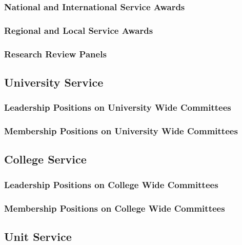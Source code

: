 \subsubsection{National and International Service Awards}

\subsubsection{Regional and Local Service Awards}

\subsubsection{Research Review Panels}

\subsection{University Service}
\subsubsection{Leadership Positions on University Wide Committees}

\subsubsection{Membership Positions on University Wide Committees}

\subsection{College Service}
\subsubsection{Leadership Positions on College Wide Committees}

\subsubsection{Membership Positions on College Wide Committees}

\subsection{Unit Service}
